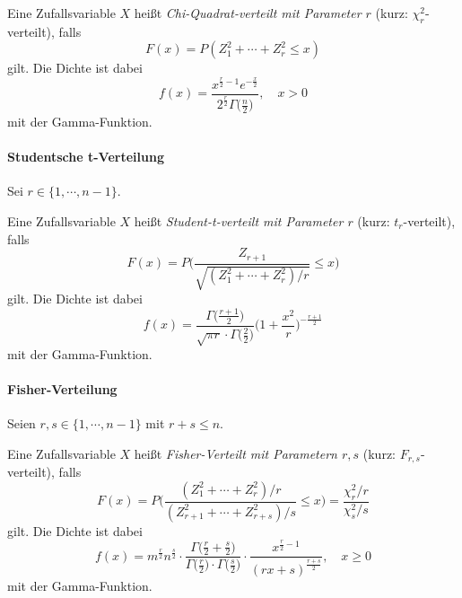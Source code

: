 					Eine Zufallsvariable \(X\) heißt \textit{Chi-Quadrat-verteilt mit Parameter \(r\)} (kurz: \( \chi_r^2 \)-verteilt), falls
					\begin{equation*}
						F(x) = P(Z_1^2 + \cdots + Z_r^2 \leq x)
					\end{equation*}
					gilt. Die Dichte ist dabei
					\begin{equation*}
						f(x) = \frac{x^{\frac{r}{2} - 1} e^{-\frac{x}{2}}}{2^\frac{r}{2} \Gamma\big(\frac{n}{2}\big)}, \quad x > 0
					\end{equation*}
					mit der Gamma-Funktion.

				\paragraph{Studentsche t-Verteilung}
					Sei \( r \in \{ 1, \cdots, n - 1 \} \).

					Eine Zufallsvariable \(X\) heißt \textit{Student-t-verteilt mit Parameter \(r\)} (kurz: \( t_r \)-verteilt), falls
					\begin{equation*}
						F(x) = P\Bigg( \frac{Z_{r+1}}{\sqrt{(Z_1^2 + \cdots + Z_r^2) / r}} \leq x \Bigg)
					\end{equation*}
					gilt. Die Dichte ist dabei
					\begin{equation*}
						f(x) = \frac{\Gamma\big(\frac{r + 1}{2}\big)}{\sqrt{\pi r} \cdot \Gamma\big(\frac{2}{2}\big)} \Bigg(1 + \frac{x^2}{r}\Bigg) ^ { -\frac{r+1}{2} }
					\end{equation*}
					mit der Gamma-Funktion.

				\paragraph{Fisher-Verteilung}
					Seien \( r, s \in \{ 1, \cdots, n - 1 \} \) mit \( r + s \leq n \).

					Eine Zufallsvariable \(X\) heißt \textit{Fisher-Verteilt mit Parametern \( r, s \)} (kurz: \(F_{r,s}\)-verteilt), falls
					\begin{equation*}
						F(x) = P\Bigg( \frac{(Z_1^2 + \cdots + Z_r^2) / r}{(Z_{r+1}^2 + \cdots + Z_{r+s}^2) / s} \leq x \Bigg) = \frac{\chi_r^2 / r}{\chi_s^2 / s}
					\end{equation*}
					gilt. Die Dichte ist dabei
					\begin{equation*}
						f(x) = m^{\frac{r}{2}} n^{\frac{s}{2}} \cdot \frac{\Gamma\big( \frac{r}{2} + \frac{s}{2} \big)}{\Gamma\big( \frac{r}{2} \big) \cdot \Gamma\big( \frac{s}{2} \big)} \cdot \frac{x^{ \frac{r}{2} - 1 }}{(rx + s)^{\frac{r + s}{2}}}, \quad x \geq 0
					\end{equation*}
					mit der Gamma-Funktion.

